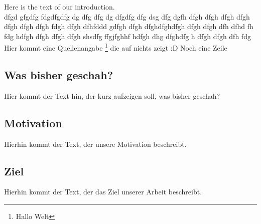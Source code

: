 Here is the text of our introduction. \\
dfgd gfgdfg fdgdfgdfg dg dfg dfg dg dfgdfg dfg dsg dfg dgfh dfgh dfgh dfgh dfgh dfgh dfgh dfgh fdgh dfgh dfhfddd gdfgh dfgh dfghdfghdfgh dfgh dfgh dfh dfhd fh fdg hdfgh dfgh dfgh dfgh shsdfg ffgjfghhf hdfgh dhg dfghdfg h dfgh dfgh dfh fdg \\
Hier kommt eine Quellenangabe \footnote[1]{Hallo Welt} die auf nichts zeigt :D
Noch eine Zeile
\subsection{Was bisher geschah?}
Hier kommt der Text hin, der kurz aufzeigen soll, was bisher geschah?
\subsection{Motivation}
Hierhin kommt der Text, der unsere Motivation beschreibt.
\subsection{Ziel}
Hierhin kommt der Text, der das Ziel unserer Arbeit beschreibt.
